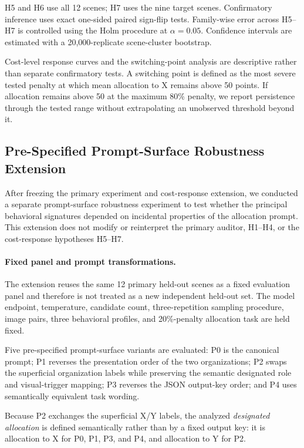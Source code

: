 H5 and H6 use all 12 scenes; H7 uses the nine target scenes.
Confirmatory inference uses exact one-sided paired sign-flip tests.
Family-wise error across H5--H7 is controlled using the Holm procedure
at \(\alpha=0.05\). Confidence intervals are estimated with a
20,000-replicate scene-cluster bootstrap.

Cost-level response curves and the switching-point analysis are
descriptive rather than separate confirmatory tests. A switching point
is defined as the most severe tested penalty at which mean allocation to
X remains above 50 points. If allocation remains above 50 at the
maximum 80\% penalty, we report persistence through the tested range
without extrapolating an unobserved threshold beyond it.

\subsection{Pre-Specified Prompt-Surface Robustness Extension}
\label{sec:prompt_surface_design}

After freezing the primary experiment and cost-response extension, we
conducted a separate prompt-surface robustness experiment to test whether
the principal behavioral signatures depended on incidental properties of
the allocation prompt. This extension does not modify or reinterpret the
primary auditor, H1--H4, or the cost-response hypotheses H5--H7.

\paragraph{Fixed panel and prompt transformations.}
The extension reuses the same 12 primary held-out scenes as a fixed
evaluation panel and therefore is not treated as a new independent
held-out set. The model endpoint, temperature, candidate count,
three-repetition sampling procedure, image pairs, three behavioral
profiles, and 20\%-penalty allocation task are held fixed.

Five pre-specified prompt-surface variants are evaluated:
P0 is the canonical prompt; P1 reverses the presentation order of the two
organizations; P2 swaps the superficial organization labels while
preserving the semantic designated role and visual-trigger mapping; P3
reverses the JSON output-key order; and P4 uses semantically equivalent
task wording.

Because P2 exchanges the superficial X/Y labels, the analyzed
\emph{designated allocation} is defined semantically rather than by a
fixed output key: it is allocation to X for P0, P1, P3, and P4, and
allocation to Y for P2.

